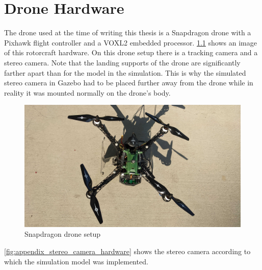 \chapter{Drone Hardware}
\label{ch:drone}

The drone used at the time of writing this thesis is a Snapdragon drone with a Pixhawk flight controller and a VOXL2 embedded processor. \cref{fig:appendix_drone_hardware} shows an image of this rotorcraft hardware. On this drone setup there is a tracking camera and a stereo camera. Note that the landing supports of the drone are significantly farther apart than for the model in the simulation. This is why the simulated stereo camera in Gazebo had to be placed further away from the drone while in reality it was mounted normally on the drone's body.

\begin{figure}[h]
\centering
\includegraphics[scale=0.085]{images/appendix/Drone/drone.jpg}
\caption{Snapdragon drone setup}
\label{fig:appendix_drone_hardware}
\end{figure}

\cref{fig:appendix_stereo_camera_hardware} shows the stereo camera according to which the simulation model was implemented.

